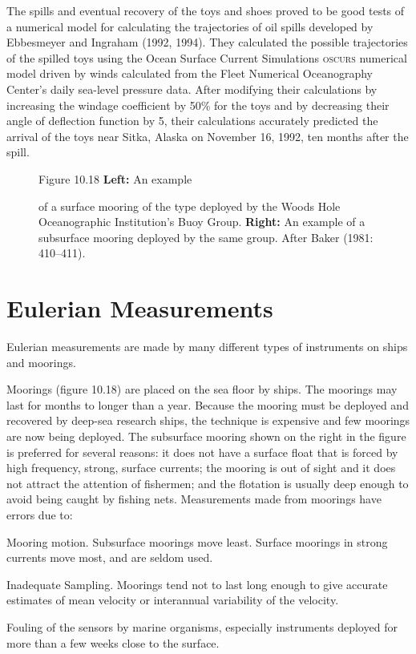 The spills and eventual recovery of the toys and shoes proved to be
good tests of a numerical model for calculating the trajectories of
oil spills developed by Ebbesmeyer and Ingraham (1992, 1994). They
calculated the possible trajectories of the spilled toys using the
Ocean Surface Current Simulations \textsc{oscurs} numerical model
driven by winds calculated from the Fleet Numerical Oceanography
Center's daily sea-level pressure data. After modifying their
calculations by increasing the windage coefficient by 50\% for the
toys and by decreasing their angle of deflection function by
5\degrees, their calculations accurately predicted the arrival of the
toys near Sitka, Alaska on November 16,
1992, ten months after the spill.

\begin{figure}[b!]
\vspace{-3ex}
\footnotesize
Figure 10.18 \textbf{Left:} An example \rule{0mm}{3ex}of a surface
mooring of the type deployed by the Woods Hole Oceanographic
Institution's Buoy Group.  \textbf{Right:} An example of a subsurface
mooring deployed by the same group.  After Baker (1981: 410--411).
\label{fig:moorings}
\end{figure}

\section{Eulerian Measurements}
Eulerian measurements are made by many
different types of instruments on ships and moorings.

Moorings (figure 10.18) are placed on the sea floor by ships. The
moorings may last for months to longer than a year. Because the
mooring must be deployed and recovered by deep-sea research ships, the
technique is expensive and few moorings are now being deployed. The
subsurface mooring shown on the right in the figure is preferred for
several reasons: it does not have a surface float that is forced by
high frequency, strong, surface currents; the mooring is out of sight
and it does not attract the attention of fishermen; and the flotation
is usually deep enough to avoid being caught by fishing
nets. Measurements made from moorings have errors due to:
\begin{enumerate}
\vitem Mooring motion. Subsurface moorings move least. Surface
moorings in strong currents move most, and are seldom used.

\vitem Inadequate Sampling. Moorings tend not to last long enough to
give accurate estimates of mean velocity or interannual variability of
the velocity.

\vitem Fouling of the sensors by marine organisms, especially
instruments deployed for more than a few weeks close to the surface.
\end{enumerate}

